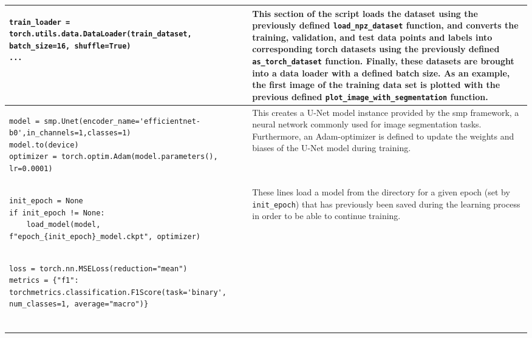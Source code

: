 \begin{longtable}{|m{}|m{}|}
\begin{lstlisting}
train_loader = torch.utils.data.DataLoader(train_dataset, batch_size=16, shuffle=True)
...
\end{lstlisting} & This section of the script loads the dataset using the previously defined \lstinline|load_npz_dataset| function, and converts the training, validation, and test data points and labels into corresponding torch datasets using the previously defined \lstinline|as_torch_dataset| function. Finally, these datasets are brought into a data loader with a defined batch size. As an example, the first image of the training data set is plotted with the previous defined \lstinline|plot_image_with_segmentation| function.
\\ \hline
\begin{lstlisting}
model = smp.Unet(encoder_name='efficientnet-b0',in_channels=1,classes=1)
model.to(device)
optimizer = torch.optim.Adam(model.parameters(), lr=0.0001)
\end{lstlisting} & This creates a U-Net model instance provided by the smp framework, a neural network commonly used for image segmentation tasks. Furthermore, an Adam-optimizer is defined to update the weights and biases of the U-Net model during training. 
\\ \hline
\begin{lstlisting}
init_epoch = None
if init_epoch != None:
    load_model(model, f"epoch_{init_epoch}_model.ckpt", optimizer)
\end{lstlisting} & These lines load a model from the directory for a given epoch (set by \lstinline|init_epoch|) that has previously been saved during the learning process in order to be able to continue training.
\\ \hline
\begin{lstlisting}
loss = torch.nn.MSELoss(reduction="mean")
metrics = {"f1": torchmetrics.classification.F1Score(task='binary', num_classes=1, average="macro")}


\end{lstlisting}
\end{longtable}
